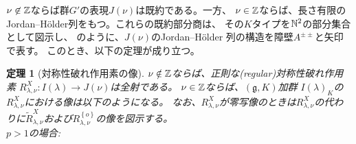 \documentclass[12pt]{article} %
\newcommand{\nin}{\not\in}
\newtheorem{theorem}{定理}
\theoremstyle{definition}
\theoremstyle{exampstyle} \newtheorem{examp}[theorem]{Theorem}
\begin{document}
	$\nu\nin\Z$ならば群$G'$の表現$J(\nu)$は既約である。一方、
	$\nu\in\mathbb{Z}$ならば、長さ有限のJordan--H\"older列をもつ。これらの既約部分商は{、}
	その$K$タイプを$\mathbb{N}^2$の部分集合として図示し、
	\cite{howe1993homogeneous}のように、$J(\nu)$のJordan--H\"older 列{の構造}を障壁$A^{\pm\pm}$と矢印で表す。
	このとき、以下の定理が成り立つ。
\begin{theorem}[対称性破れ作用素の像]
	$\nu\notin\mathbb{Z}$ならば、正則な(regular)対称性破れ作用素 $R_{\lambda,\nu}^X:I(\lambda)\to J(\nu)$は全射である。
	$\nu\in\mathbb{Z}$ならば、$(\mathfrak{g},K)$加群 $I(\lambda)_K$の
	$R_{\lambda,\nu}^X$における像は以下のようになる。
	なお、$R_{\lambda,\nu}^X$が零写像のときは$R_{\lambda,\nu}^X$の代わりに$\tilde{R}_{\lambda,\nu}^X$および$R_{\lambda,\nu}^{ \left\{ o \right\}}$の像を図示する。\\
	$p>1$の場合:
\end{theorem}
\end{document}
